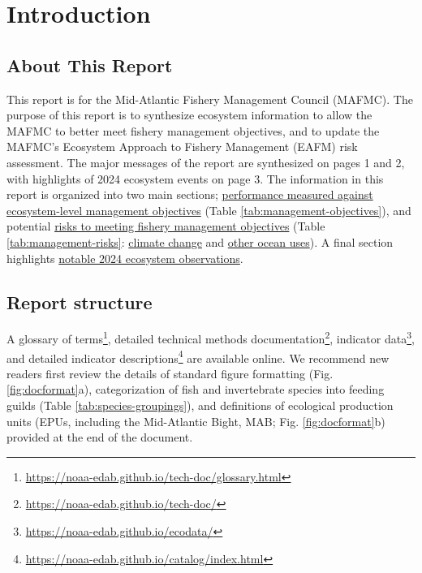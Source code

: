 \documentclass[
  10pt,
]{article}
\author{}
\date{\vspace{-2.5em}}
\begin{document}
\setcounter{page}{4}
\thispagestyle{fancy}

\hypertarget{introduction}{%
\section{Introduction}\label{introduction}}

\hypertarget{about-this-report}{%
\subsection{About This Report}\label{about-this-report}}

This report is for the Mid-Atlantic Fishery Management Council (MAFMC). The purpose of this report is to synthesize ecosystem information to allow the MAFMC to better meet fishery management objectives, and to update the MAFMC's Ecosystem Approach to Fishery Management (EAFM) risk assessment. The major messages of the report are synthesized on pages 1 and 2, with highlights of 2024 ecosystem events on page 3. The information in this report is organized into two main sections; \protect\hyperlink{performance-relative-to-fishery-management-objectives}{performance measured against ecosystem-level management objectives} (Table \ref{tab:management-objectives}), and potential \protect\hyperlink{risks-to-meeting-fishery-management-objectives}{risks to meeting fishery management objectives} (Table \ref{tab:management-risks}: \protect\hyperlink{climate-and-ecosystem-change}{climate change} and \protect\hyperlink{other-ocean-uses-offshore-wind}{other ocean uses}). A final section highlights \protect\hyperlink{highlights}{notable 2024 ecosystem observations}.

\hypertarget{report-structure}{%
\subsection{Report structure}\label{report-structure}}

A glossary of terms\footnote{\url{https://noaa-edab.github.io/tech-doc/glossary.html}}, detailed technical methods documentation\footnote{\url{https://noaa-edab.github.io/tech-doc/}}, indicator data\footnote{\url{https://noaa-edab.github.io/ecodata/}}, and detailed indicator descriptions\footnote{\url{https://noaa-edab.github.io/catalog/index.html}} are available online. We recommend new readers first review the details of standard figure formatting (Fig. \ref{fig:docformat}a), categorization of fish and invertebrate species into feeding guilds (Table \ref{tab:species-groupings}), and definitions of ecological production units (EPUs, including the Mid-Atlantic Bight, MAB; Fig. \ref{fig:docformat}b) provided at the end of the document.
\end{document}

